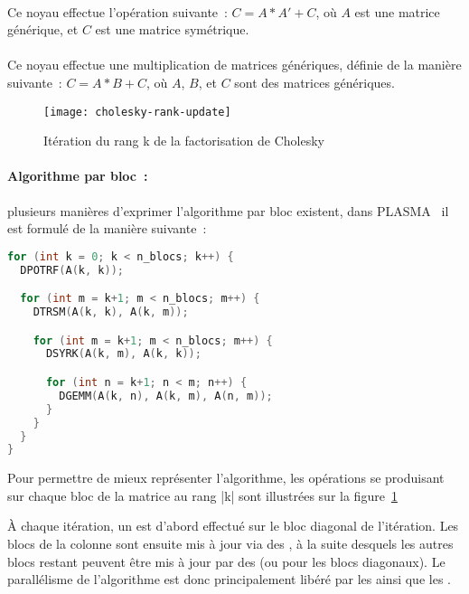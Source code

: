 \paragraph{}

Ce noyau effectue l'opération suivante~: $C = A*A' + C$, où $A$ est une matrice générique, et $C$ est une matrice symétrique.

\paragraph{}

Ce noyau effectue une multiplication de matrices génériques, définie de la manière suivante~: $C = A*B + C$, où $A$, $B$, et $C$ sont des matrices génériques.

\begin{figure}[h]
  \centering
  \texttt{[image: cholesky-rank-update]}
  \caption{Itération du rang k de la factorisation de Cholesky}\label{fig:contribs:apps:cholesky:rank-update}
\end{figure}

\paragraph{Algorithme par bloc~:} plusieurs manières d'exprimer l'algorithme par bloc existent, dans PLASMA~\cite{Kurzak2013} il est formulé de la manière suivante~:

\begin{lstlisting}[language=c++]
for (int k = 0; k < n_blocs; k++) {
  DPOTRF(A(k, k));

  for (int m = k+1; m < n_blocs; m++) {
    DTRSM(A(k, k), A(k, m));

    for (int m = k+1; m < n_blocs; m++) {
      DSYRK(A(k, m), A(k, k));

      for (int n = k+1; n < m; n++) {
        DGEMM(A(k, n), A(k, m), A(n, m));
      }
    }
  }
}
\end{lstlisting}

Pour permettre de mieux représenter l'algorithme, les opérations se produisant sur chaque bloc de la matrice au rang |k| sont illustrées sur la figure~\ref{fig:contribs:apps:cholesky:rank-update}


À chaque itération, un \potrf est d'abord effectué sur le bloc diagonal de l'itération. Les blocs de la colonne sont ensuite mis à jour via des \trsm, à la suite desquels les autres blocs restant peuvent être mis à jour par des \gemm (ou \syrk pour les blocs diagonaux).
Le parallélisme de l'algorithme est donc principalement libéré par les \potrf ainsi que les \trsm.

